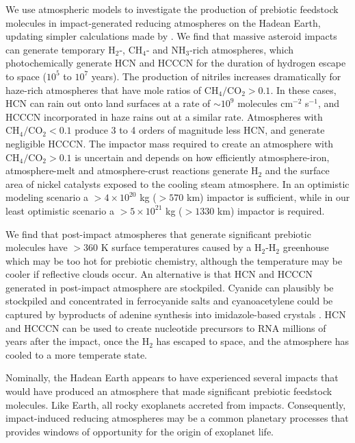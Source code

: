 We use atmospheric models to investigate the production of prebiotic feedstock molecules in impact-generated reducing atmospheres on the Hadean Earth, updating simpler calculations made by \citet{Zahnle_2020}. We find that massive asteroid impacts can generate temporary H$_2$-, CH$_4$- and NH$_3$-rich atmospheres, which photochemically generate HCN and HCCCN for the duration of hydrogen escape to space ($10^5$ to $10^7$ years). The production of nitriles increases dramatically for haze-rich atmospheres that have mole ratios of $\mathrm{CH_4}/\mathrm{CO_2} > 0.1$. In these cases, HCN can rain out onto land surfaces at a rate of $\sim 10^9$ molecules cm$^{-2}$ s$^{-1}$, and HCCCN incorporated in haze rains out at a similar rate. Atmospheres with $\mathrm{CH_4}/\mathrm{CO_2} < 0.1$ produce 3 to 4 orders of magnitude less HCN, and generate negligible HCCCN. The impactor mass required to create an atmosphere with $\mathrm{CH_4}/\mathrm{CO_2} > 0.1$ is uncertain and depends on how efficiently atmosphere-iron, atmosphere-melt and atmosphere-crust reactions generate H$_2$ and the surface area of nickel catalysts exposed to the cooling steam atmosphere. In an optimistic modeling scenario a $> 4 \times 10^{20}$ kg ($> 570$ km) impactor is sufficient, while in our least optimistic scenario a $> 5 \times 10^{21}$ kg ($> 1330$ km) impactor is required. 

We find that post-impact atmospheres that generate significant prebiotic molecules have $> 360$ K surface temperatures caused by a H$_2$-H$_2$ greenhouse which may be too hot for prebiotic chemistry, although the temperature may be cooler if reflective clouds occur. An alternative is that HCN and HCCCN generated in post-impact atmosphere are stockpiled. Cyanide can plausibly be stockpiled and concentrated in ferrocyanide salts and cyanoacetylene could be captured by byproducts of adenine synthesis into imidazole-based crystals \citep{Ritson_2022}. HCN and HCCCN can be used to create nucleotide precursors to RNA millions of years after the impact, once the H$_2$ has escaped to space, and the atmosphere has cooled to a more temperate state.

Nominally, the Hadean Earth appears to have experienced several impacts that would have produced an atmosphere that made significant prebiotic feedstock molecules. Like Earth, all rocky exoplanets accreted from impacts. Consequently, impact-induced reducing atmospheres may be a common planetary processes that provides windows of opportunity for the origin of exoplanet life.

